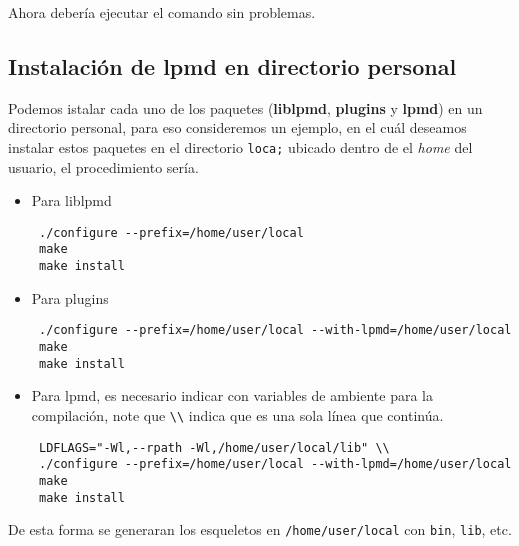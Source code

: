 Ahora deber\'ia ejecutar el comando sin problemas.

\subsection{Instalaci\'on de lpmd en directorio personal}
\label{subsub:personaldir}

Podemos istalar cada uno de los paquetes (\textbf{liblpmd}, \textbf{plugins} y \textbf{lpmd}) en un directorio personal, para eso consideremos un ejemplo, en el cu\'al deseamos instalar estos paquetes en el directorio \verb|loca;| ubicado dentro de el \textit{home} del usuario, el procedimiento ser\'ia.

\begin{itemize}
 \item Para liblpmd
 \begin{verbatim}
 ./configure --prefix=/home/user/local
 make
 make install
 \end{verbatim}
 \item Para plugins
 \begin{verbatim}
 ./configure --prefix=/home/user/local --with-lpmd=/home/user/local
 make
 make install
 \end{verbatim}
 \item Para lpmd, es necesario indicar con variables de ambiente para la compilaci\'on, note que \verb|\\| indica que es una sola l\'inea que contin\'ua.
 \begin{verbatim}
 LDFLAGS="-Wl,--rpath -Wl,/home/user/local/lib" \\
 ./configure --prefix=/home/user/local --with-lpmd=/home/user/local
 make
 make install
 \end{verbatim}
\end{itemize}

De esta forma se generaran los esqueletos en \verb|/home/user/local| con \verb|bin|, \verb|lib|, etc.



% 
% 

